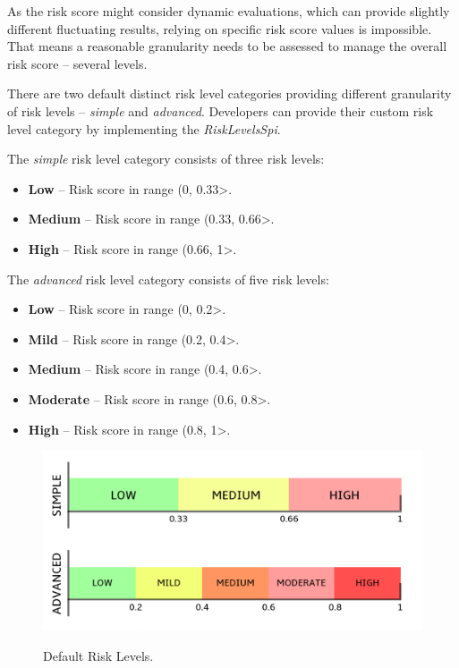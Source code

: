 As the risk score might consider dynamic evaluations, which can provide slightly different fluctuating results, relying on specific risk score values is impossible.
That means a reasonable granularity needs to be assessed to manage the overall risk score -- several levels.

There are two default distinct risk level categories providing different granularity of risk levels -- \textit{simple} and \textit{advanced}.
Developers can provide their custom risk level category by implementing the \textit{RiskLevelsSpi}.

\newpage

The \textit{simple} risk level category consists of three risk levels:
\begin{itemize}
    \item \textbf{Low} -- Risk score in range (0, 0.33>.
    \item \textbf{Medium} -- Risk score in range (0.33, 0.66>.
    \item \textbf{High} -- Risk score in range (0.66, 1>.
\end{itemize}

The \textit{advanced} risk level category consists of five risk levels:
\begin{itemize}
    \item \textbf{Low} -- Risk score in range (0, 0.2>.
    \item \textbf{Mild} -- Risk score in range (0.2, 0.4>.
    \item \textbf{Medium} -- Risk score in range (0.4, 0.6>.
    \item \textbf{Moderate} -- Risk score in range (0.6, 0.8>.
    \item \textbf{High} -- Risk score in range (0.8, 1>.
\end{itemize}

\begin{figure}[htbp]
  \centering
  \includegraphics[width=1\textwidth]{img/sections/5-design/risk-levels.png}
  \label{fig:risk-levels}
  \caption{Default Risk Levels.}
\end{figure}

